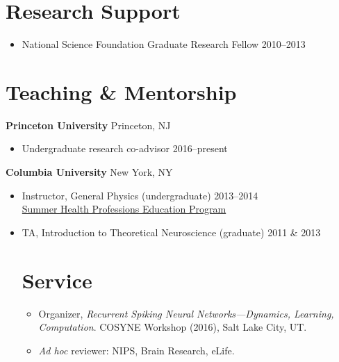 \documentclass[margin, 10pt]{res}
\begin{document}
\begin{resume}
\section{\textnormal\bf{Research Support}} 

\begin{itemize}[label = {}]
\itemsep-0.25em 
\item National Science Foundation Graduate Research Fellow \hfill 2010--2013
\end{itemize}

\newpage

\section{\textnormal\bf{Teaching \& Mentorship}} 

\textbf{Princeton University} \hfill Princeton, NJ\\
\vspace{-3mm}
\begin{itemize}[label={}]
\itemsep 0.75em 

\item Undergraduate research co-advisor \hfill 2016--present \\

\end{itemize}

\textbf{Columbia University} \hfill New York, NY\\
\vspace{-3mm}
\begin{itemize}[label={}]
\itemsep 0.75em 

\item Instructor, General Physics (undergraduate) \hfill 2013--2014 \\
\href{http://www.shpep.org}{Summer Health Professions Education Program}

\item TA, Introduction to Theoretical Neuroscience (graduate) \hfill 2011 \& 2013

\section{\textnormal\bf{Service}}

\begin{itemize}[label = {}]
\itemsep1em
\item Organizer, \emph{Recurrent Spiking Neural Networks---Dynamics, Learning, Computation}. COSYNE Workshop (2016), Salt Lake City, UT.
\item \emph{Ad hoc} reviewer: NIPS, Brain Research, eLife.
\end{itemize}


\end{itemize}
\end{resume}
\end{document}
